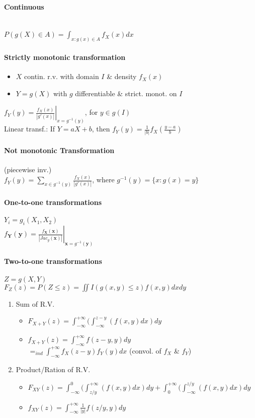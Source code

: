 \documentclass[paper=a4,fontsize=8pt,pagesize,DIV=calc]{scrartcl}
\begin{document}
\begin{multicols}{3}
\paragraph{Continuous}~~\\ $P(g(X)\in A)=\int_{x:g(x)\in A} f_X(x)dx$\\
\paragraph{Strictly monotonic transformation}
\begin{itemize}
\item $X$ contin. r.v. with domain $I$ \& density $f_X(x)$
\item $Y=g(X)$ with $g$ differentiable  \& strict. monot. on $I$
\end{itemize}
$f_Y(y)=\left.\frac{f_X(x)}{|g'(x)|} \right|_{x=g^{-1}(y)}$, for $ y \in g(I)$\\
Linear transf.: If $Y=aX+b$, then $f_Y(y)=\frac{1}{|b|}f_X \left( \frac{y-a}{b}\right)$
\paragraph{Not monotonic Transformation} (piecewise inv.) ~~\\
$f_Y(y)=\sum_{x\in g^{-1}(y)} \frac{f_X(x)}{|g'(x)|} $, where $ g^{-1}(y)= \{x:g(x)=y\}$
\paragraph{One-to-one transformations} $Y_i=g_i(X_1,X_2)$\\
$f_\textbf{Y}(\textbf{y})=\left.\frac{f_\textbf{X}(\textbf{x})}{|Jac_g(\textbf{x})|} \right|_{\textbf{x}=g^{-1}(\textbf{y})}$
\paragraph{Two-to-one transformations} $Z=g(X,Y)$\\
$F_Z(z)=P(Z\leq z)= \iint I(g(x,y)\leq z)f(x,y)dxdy$
\begin{enumerate}
\item Sum of R.V.
\begin{itemize}
\item $F_{X+Y}(z)=\int^{+\infty}_{-\infty}(\int^{z-y}_{-\infty}(f(x,y)dx)dy$
\item $f_{X+Y}(z)=\int^{+\infty}_{-\infty}f(z-y,y)dy$\\$=_{ind}\int^{+\infty}_{-\infty}f_X(z-y)f_Y(y)dx$ (convol. of $f_X$ \& $f_Y$)
\end{itemize}
\item Product/Ration of R.V.
\begin{itemize}
\item $F_{XY}(z)=\int^{0}_{-\infty}(\int^{+\infty}_{z/y}(f(x,y)dx)dy+\int^{+\infty}_{0}(\int^{z/y}_{-\infty}(f(x,y)dx)dy$
\item $f_{XY}(z)=\int^{+\infty}_{-\infty}\frac{1}{|y|}f(z/y,y)dy$
\end{itemize}
\end{enumerate}

\end{multicols}
\end{document}
